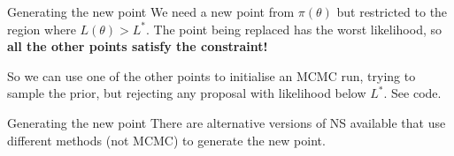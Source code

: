\documentclass{beamer}
\begin{document}
\begin{frame}[t]{Generating the new point}
We need a new point from $\pi(\theta)$ but restricted to the region where $L(\theta)>L^*$. The point being replaced has the worst likelihood, so
{\bf all the other points satisfy the constraint!}
\vspace{20pt}

So we can use one of the other points to initialise an MCMC run, trying to
sample the prior, but rejecting any proposal with likelihood below $L^*$.
See code.
\end{frame}

\begin{frame}[t]{Generating the new point}
There are alternative versions of NS available that
use different methods (not MCMC) to generate the new point.
\end{frame}









\end{document}
